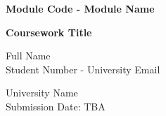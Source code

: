\begin{titlepage}
    \begin{center}
        \vspace*{3cm}
        
        \textbf{Module Code - Module Name}
        
        \vspace{0.5cm}
        \textbf{Coursework Title}
        
        \vspace{1.5cm}
        
        Full Name\\Student Number - University Email
        
        \vfill
        University Name\\
       Submission Date: TBA\\
    \end{center}
\end{titlepage}

